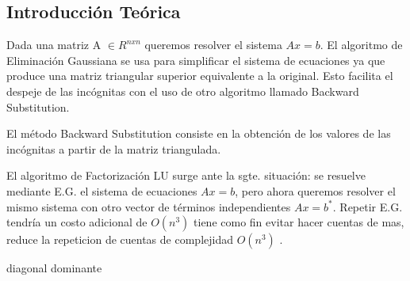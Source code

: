 \subsection{Introducción Teórica}

Dada una matriz A $\in R^{nxn}$ queremos resolver el sistema $Ax = b$. El algoritmo de Eliminación Gaussiana se usa para simplificar el sistema de ecuaciones ya que produce una matriz triangular superior equivalente a la original. Esto facilita el despeje de las incógnitas con el uso de otro algoritmo llamado Backward Substitution.

El método Backward Substitution consiste en la obtención de los valores de las incógnitas a partir de la matriz triangulada.

El algoritmo de Factorización LU surge ante la sgte. situación: se resuelve mediante E.G. el sistema de ecuaciones $Ax = b$, pero ahora queremos resolver el mismo sistema con otro vector de términos independientes $Ax = b^{*}$. Repetir E.G. tendría un costo adicional de $O(n^{3})$ tiene como fin evitar hacer cuentas de mas, reduce la repeticion de cuentas de complejidad $O(n^{3})$ .

diagonal dominante


